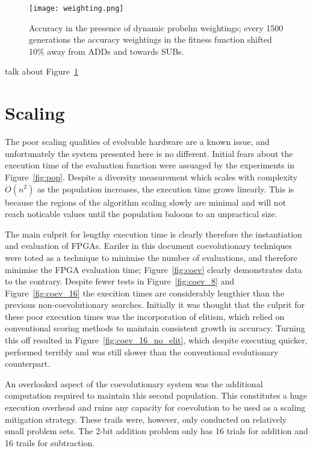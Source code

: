 \begin{figure}
	\centering
	\texttt{[image: weighting.png]}
	\caption[Accuracy in the presence of dynamic probelm weightings]
	{Accuracy in the presence of dynamic probelm weightings;
		every 1500 generations the accuracy weightings in the fitness
	function shifted 10\% away from ADDs and towards SUBs.}
	\label{fig:weight}
\end{figure}

\todo talk about Figure~\ref{fig:weight}

\section{Scaling \label{s:scaling}}

The poor scaling qualities of evolvable hardware are a known issue, and
unfortunately the system presented here is no different. Initial fears
about the execution time of the evaluation function were assuaged by
the experiments in Figure~\ref{fig:pop}. Despite a diversity measurement
which scales with complexity $O(n^2)$ as the population increases, the
execution time grows linearly. This is because the regions of the algorithm
scaling slowly are minimal and will not reach noticable values until the
population baloons to an unpractical size.

The main culprit for lengthy execution time is clearly therefore the
instantiation and evaluation of FPGAs. Eariler in this document coevolutionary
techniques were toted as a technique to minimise the number of evaluations,
and therefore minimise the FPGA evaluation time; Figure~\ref{fig:coev}
clearly demonstrates data to the contrary. Despite fewer tests in
Figure~\ref{fig:coev_8} and Figure~\ref{fig:coev_16} the execition times
are considerably lengthier than the previous non-coevolutionary searches.
Initially it was thought that the culprit for these poor execution times
was the incorporation of elitism, which relied on conventional scoring
methods to maintain consistent growth in accuracy. Turning this off
resulted in Figure~\ref{fig:coev_16_no_elit}, which despite executing quicker,
performed terribly and was still slower than the conventional evolutionary
counterpart.

An overlooked aspect of the coevolutionary system was the additional computation
required to maintain this second population. This constitutes a huge execution
overhead and ruins any capacity for coevolution to be used as a scaling mitigation
strategy. These trails were, however, only conducted on relatively small problem
sets. The 2-bit addition problem only has 16 trials for addition and 16 trails
for subtraction.

